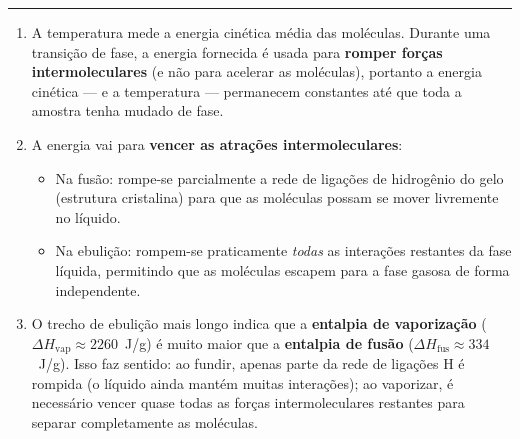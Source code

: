 \documentclass[10pt,a4paper]{article}
\newcommand{\resolucaosep}{%
  \vspace{0.4cm}
  \noindent\rule{\textwidth}{0.4pt}
  \vspace{0.1cm}

  \noindent{\bf Resolução:}
  \vspace{0.2cm}
}
\begin{document}
\resolucaosep

\begin{enumerate}
  \item A temperatura mede a energia cinética média das moléculas. Durante
        uma transição de fase, a energia fornecida é usada para
        \textbf{romper forças intermoleculares} (e não para acelerar as
        moléculas), portanto a energia cinética --- e a temperatura ---
        permanecem constantes até que toda a amostra tenha mudado de fase.

  \item A energia vai para \textbf{vencer as atrações intermoleculares}:
        \begin{itemize}
          \item Na fusão: rompe-se parcialmente a rede de ligações de
                hidrogênio do gelo (estrutura cristalina) para que as
                moléculas possam se mover livremente no líquido.
          \item Na ebulição: rompem-se praticamente \emph{todas} as
                interações restantes da fase líquida, permitindo que as
                moléculas escapem para a fase gasosa de forma independente.
        \end{itemize}

  \item O trecho de ebulição mais longo indica que a
        \textbf{entalpia de vaporização} ($\Delta H_{\text{vap}}
        \approx 2260$~J/g) é muito maior que a
        \textbf{entalpia de fusão} ($\Delta H_{\text{fus}}
        \approx 334$~J/g). Isso faz sentido: ao fundir, apenas parte da
        rede de ligações H é rompida (o líquido ainda mantém muitas
        interações); ao vaporizar, é necessário vencer quase todas as
        forças intermoleculares restantes para separar completamente as
        moléculas.
\end{enumerate}
\end{document}
